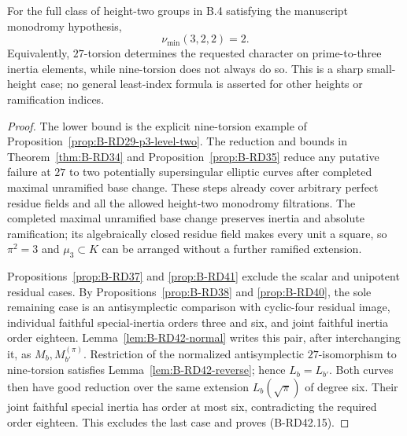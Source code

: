\begin{theorem}[B-RD42: the exact least height-two index at $p=3,e=2$]
\label{thm:B-RD42}
For the full class of height-two groups in B.4 satisfying the manuscript
monodromy hypothesis,
\[
                              \boxed{\nu_{\min}(3,2,2)=2}.
                                                        \tag{B-RD42.15}
\]
Equivalently, $27$-torsion determines the requested character on
prime-to-three inertia elements, while nine-torsion does not always do so.
This is a sharp small-height case; no general least-index formula is
asserted for other heights or ramification indices.
\end{theorem}
\begin{proof}
The lower bound is the explicit nine-torsion example of
Proposition~\ref{prop:B-RD29-p3-level-two}. The reduction and bounds in
Theorem~\ref{thm:B-RD34} and Proposition~\ref{prop:B-RD35} reduce
any putative failure at $27$ to two potentially supersingular elliptic
curves after completed maximal unramified base change. These steps
already cover arbitrary perfect residue fields and all the allowed
height-two monodromy filtrations. The completed maximal unramified
base change preserves inertia and absolute ramification; its algebraically
closed residue field makes every unit a square, so $\pi^2=3$ and
$\mu_3\subset K$ can be arranged without a further ramified extension.

Propositions~\ref{prop:B-RD37} and \ref{prop:B-RD41} exclude the
scalar and unipotent residual cases. By
Propositions~\ref{prop:B-RD38} and \ref{prop:B-RD40}, the sole remaining
case is an antisymplectic comparison with cyclic-four residual image,
individual faithful special-inertia orders three and six, and joint
faithful inertia order eighteen. Lemma~\ref{lem:B-RD42-normal}
writes this pair, after interchanging it, as $M_b,M_{b'}^{(\pi)}$.
Restriction of the normalized antisymplectic $27$-isomorphism to
nine-torsion satisfies Lemma~\ref{lem:B-RD42-reverse}; hence
$L_b=L_{b'}$. Both curves then have good reduction over the same
extension $L_b(\sqrt\pi)$ of degree six. Their joint faithful special
inertia has order at most six, contradicting the required order
eighteen. This excludes the last case and proves (B-RD42.15).
\end{proof}

